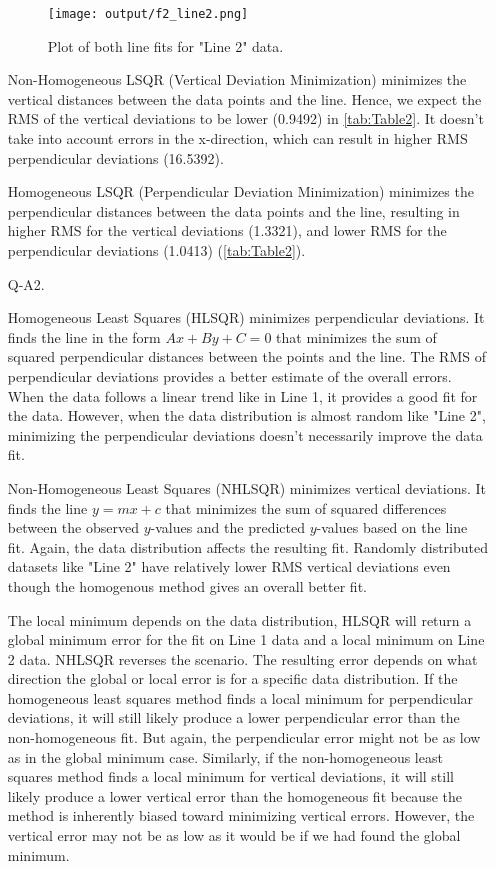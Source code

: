 \documentclass[12pt]{report}
\begin{document}
\begin{enumerate}
    \begin{figure}[H]
        \centering
        \texttt{[image: output/f2\_line2.png]}
        \caption{Plot of both line fits for "Line 2" data.}
        \label{fig:Figure1}
    \end{figure}

    \FloatBarrier 

    Non-Homogeneous LSQR (Vertical Deviation Minimization) minimizes the vertical distances between the data points and the line. Hence, 
    we expect the RMS of the vertical deviations to be lower (0.9492) in \autoref{tab:Table2}. It doesn't take into account errors in the 
    x-direction, which can result in higher RMS perpendicular deviations (16.5392).

    Homogeneous LSQR (Perpendicular Deviation Minimization) minimizes the perpendicular distances between the data points and the line, 
    resulting in higher RMS for the vertical deviations (1.3321), and lower RMS for the perpendicular deviations (1.0413)  
    (\autoref{tab:Table2}).

    \item[Q-A2.]

    Homogeneous Least Squares (HLSQR) minimizes perpendicular deviations. It finds the line in the form  $Ax+By+C=0$ that minimizes 
    the sum of squared perpendicular distances between the points and the line. The RMS of perpendicular deviations provides a better 
    estimate of the overall errors. When the data follows a linear trend like in Line 1, it provides a good fit for the data. However,
    when the data distribution is almost random like "Line 2", minimizing the perpendicular deviations doesn't necessarily improve the data
    fit.

    Non-Homogeneous Least Squares (NHLSQR) minimizes vertical deviations. It finds the line $y=mx+c$ that minimizes the sum of squared differences 
    between the observed $y$-values and the predicted $y$-values based on the line fit. Again, the data distribution affects the resulting fit.
    Randomly distributed datasets like "Line 2" have relatively lower RMS vertical deviations even though the homogenous method gives an overall 
    better fit.

    The local minimum depends on the data distribution, HLSQR will return a global minimum error for the fit on Line 1 data and a local minimum on Line 2 
    data. NHLSQR reverses the scenario. The resulting error depends on what direction the global or local error is for a specific data distribution.
    If the homogeneous least squares method finds a local minimum for perpendicular deviations, it will still likely produce a lower perpendicular 
    error than the non-homogeneous fit. But again, the perpendicular error might not be as low as in the global minimum case. Similarly, if the non-homogeneous 
    least squares method finds a local minimum for vertical deviations, it will still likely produce a lower vertical error than the homogeneous fit because 
    the method is inherently biased toward minimizing vertical errors. However, the vertical error may not be as low as it would be if we had found the 
    global minimum.


\end{enumerate}
\end{document}
